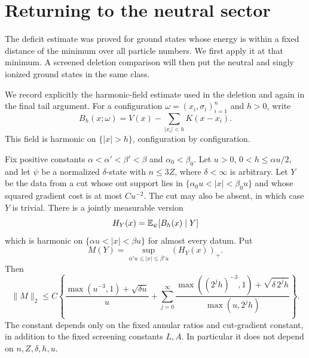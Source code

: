 \section{Returning to the neutral sector}\label{a:sec:neutral}

The deficit estimate was proved for ground states whose energy is within a
fixed distance of the minimum over all particle numbers.  We first apply it
at that minimum.  A screened deletion comparison will then put the neutral
and singly ionized ground states in the same class.

We record explicitly the harmonic-field estimate used in the deletion and
again in the final tail argument.  For a configuration $\omega=(x_i,\sigma_i)_{i=1}^n$
and $h>0$, write
\begin{equation}\label{a:eq:tail-inner-field}
 B_h(x;\omega)=V(x)-\sum_{|x_i|<h}K(x-x_i).
\end{equation}
This field is harmonic on $\{|x|>h\}$, configuration by configuration.

\begin{lemma}\label{a:lem:tail-harmonic}
Fix positive constants $\alpha<\alpha'<\beta'<\beta$ and
$\alpha_0<\beta_0$.  Let $u>0$, $0<h\le\alpha u/2$, and let $\psi$ be a
normalized $\delta$-state with $n\le3Z$, where $\delta<\infty$ is arbitrary.
Let $Y$ be the data from a cut whose out support lies in
$\{\alpha_0u<|x|<\beta_0u\}$ and whose squared gradient cost is at most
$C u^{-2}$.  The cut may also be absent, in which case $Y$ is trivial.
There is a jointly measurable version
\[
 H_Y(x)=\mathbb E_\psi[B_h(x)\mid Y]
\]
which is harmonic on $\{\alpha u<|x|<\beta u\}$ for almost every datum.
Put
\[
 M(Y)=\sup_{\alpha'u\le|x|\le\beta'u}(H_Y(x))_+.
\]
Then
\begin{equation}\label{a:eq:tail-harmonic-bound}
 \|M\|_2\le C\left\{
 \frac{\max(u^{-3},1)+\sqrt{\delta u}}{u}
 +\sum_{j=0}^\infty
 \frac{\max((2^jh)^{-3},1)+\sqrt{\delta\,2^jh}}
      {\max(u,2^jh)}\right\}.
\end{equation}
The constant depends only on the fixed annular ratios and cut-gradient
constant, in addition to the fixed screening constants $L,A$.  In
particular it does not depend on $n,Z,\delta,h,u$.
\end{lemma}

